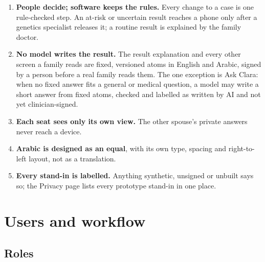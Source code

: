 \documentclass[10.5pt,a4paper]{article}
\newcommand{\chapterbreak}{}
\let\oldsection\section
\renewcommand{\section}{\chapterbreak\oldsection}
\begin{document}
\begin{enumerate}
  \item \textbf{People decide; software keeps the rules.} Every change to a case is one rule-checked step. An at-risk
        or uncertain result reaches a phone only after a genetics specialist releases it; a routine result is explained
        by the family doctor.
  \item \textbf{No model writes the result.} The result explanation and every other screen a family reads are fixed,
        versioned atoms in English and Arabic, signed by a person before a real family reads them. The one exception
        is Ask Clara: when no fixed answer fits a general or medical question, a model may write a short answer from
        fixed atoms, checked and labelled as written by AI and not yet clinician-signed.
  \item \textbf{Each seat sees only its own view.} The other spouse's private answers never reach a device.
  \item \textbf{Arabic is designed as an equal}, with its own type, spacing and right-to-left layout, not as a
        translation.
  \item \textbf{Every stand-in is labelled.} Anything synthetic, unsigned or unbuilt says so; the Privacy page lists every prototype stand-in in one place.
\end{enumerate}

\section{Users and workflow}

\subsection{Roles}
\end{document}

